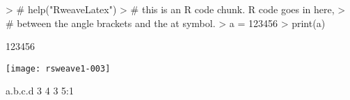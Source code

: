 \documentclass{article}
\begin{document}


 
\begin{Schunk}
\begin{Sinput}
> # help("RweaveLatex")
> # this is an R code chunk.  R code goes in here, 
> # between the angle brackets and the at symbol.
> a = 123456
> print(a)
\end{Sinput}
\begin{Soutput}
[1] 123456
\end{Soutput}
\end{Schunk}


\texttt{[image: rsweave1-003]}

\begin{Schunk}
\begin{Soutput}
    a.b.c.d 
 3 4 3 5:1  
\end{Soutput}
\end{Schunk}
\end{document}
